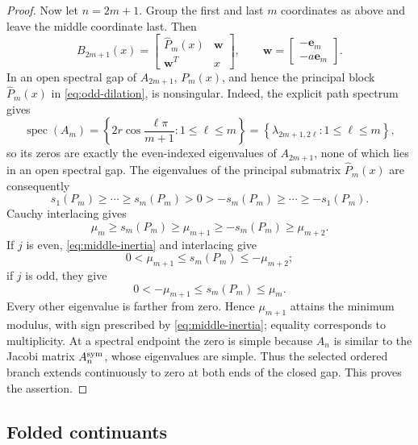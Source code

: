 \documentclass[10pt,twoside]{siamart1116}
\numberwithin{equation}{section}
\begin{document}
\begin{proof}
Now let \(n=2m+1\).  Group the first and last \(m\) coordinates as
above and leave the middle coordinate last.  Then
\begin{equation}\label{eq:odd-dilation}
 B_{2m+1}(x)=
 \begin{bmatrix}\widehat P_m(x)&\boldsymbol w\\\boldsymbol w^T&x\end{bmatrix},
 \qquad
 \boldsymbol w=\begin{bmatrix}-\mathbf e_m\\-a\mathbf e_m\end{bmatrix}.
\end{equation}
In an open spectral gap of \(A_{2m+1}\), \(P_m(x)\), and hence the principal
block \(\widehat P_m(x)\) in \eqref{eq:odd-dilation}, is nonsingular.  Indeed,
the explicit path spectrum gives
\[
 \operatorname{spec}(A_m)
 =\left\{2r\cos\frac{\ell\pi}{m+1}:1\leq\ell\leq m\right\}
 =\left\{\lambda_{2m+1,2\ell}:1\leq\ell\leq m\right\},
\]
so its zeros are exactly the even-indexed eigenvalues of \(A_{2m+1}\), none
of which lies in an open spectral gap.
The eigenvalues of the principal submatrix \(\widehat P_m(x)\) are
consequently
\[
 s_1(P_m)\geq\cdots\geq s_m(P_m)>0>
 -s_m(P_m)\geq\cdots\geq-s_1(P_m).
\]
Cauchy interlacing gives
\[
 \mu_m\geq s_m(P_m)\geq\mu_{m+1}
 \geq-s_m(P_m)\geq\mu_{m+2}.
\]
If \(j\) is even, \eqref{eq:middle-inertia} and interlacing give
\[
 0<\mu_{m+1}\leq s_m(P_m)\leq-\mu_{m+2};
\]
if \(j\) is odd, they give
\[
 0<-\mu_{m+1}\leq s_m(P_m)\leq\mu_m.
\]
Every other eigenvalue is farther from zero.  Hence
\(\mu_{m+1}\) attains the minimum modulus, with sign prescribed by
\eqref{eq:middle-inertia}; equality corresponds to multiplicity.  At a
spectral endpoint the zero is simple because \(A_n\) is similar to the
Jacobi matrix \(A_n^{\rm sym}\), whose eigenvalues are simple.  Thus the selected
ordered branch extends continuously to zero at both ends of the closed
gap.  This proves the assertion.
\end{proof}

\subsection{Folded continuants}
\label{subsec:folded-continuants}
\end{document}
